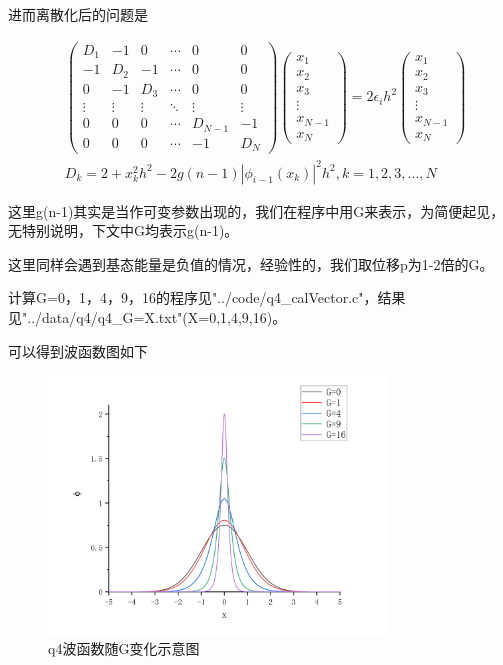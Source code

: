 \documentclass[10pt, a4paper]{article}
\begin{document}
    进而离散化后的问题是

    \begin{align*}
      &\begin{pmatrix}
        D_1&-1&0&\cdots&0&0\\
        -1& D_2&-1&\cdots&0&0\\
        0&-1&D_3&\cdots&0&0\\
        \vdots&\vdots&\vdots&\ddots&\vdots&\vdots\\
        0&0&0&\cdots& D_{N-1}&-1\\
        0&0&0&\cdots&-1&D_N
      \end{pmatrix}
      \begin{pmatrix}
        x_1\\
        x_2\\
        x_3\\
        \vdots\\
        x_{N-1}\\
        x_N
      \end{pmatrix}=
      2\epsilon_ih^2
      \begin{pmatrix}
        x_1\\
        x_2\\
        x_3\\
        \vdots\\
        x_{N-1}\\
        x_N
      \end{pmatrix}\\
      &D_k=2+x_k^2h^2-2g(n-1)|\phi_{i-1}(x_k)|^2h^2,k=1,2,3,...,N
    \end{align*}

    这里g(n-1)其实是当作可变参数出现的，我们在程序中用G来表示，为简便起见，无特别说明，下文中G均表示g(n-1)。

    这里同样会遇到基态能量是负值的情况，经验性的，我们取位移p为1-2倍的G。

    计算G=0，1，4，9，16的程序见"../code/q4_calVector.c"，结果见"../data/q4/q4_G=X.txt"(X=0,1,4,9,16)。

    可以得到波函数图如下

    \begin{figure}[H]
      \centering
      \includegraphics[width=0.8\textwidth]{q4波函数随G变化示意图.jpg}
      \caption{q4波函数随G变化示意图}\label{fig:q4波函数随G变化示意图}
    \end{figure}
\end{document}
